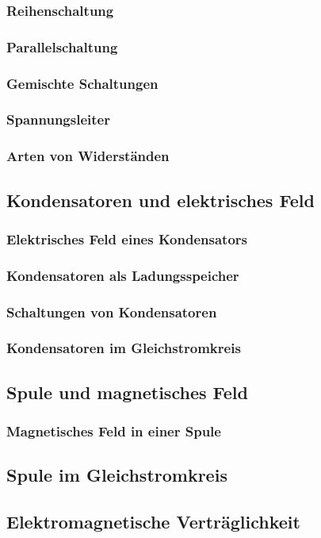 \subsubsection{Reihenschaltung}
\subsubsection{Parallelschaltung}
\subsubsection{Gemischte Schaltungen}
\subsubsection{Spannungsleiter}
\subsubsection{Arten von Widerständen}

\subsection{Kondensatoren und elektrisches Feld}
\subsubsection{Elektrisches Feld eines Kondensators}
\subsubsection{Kondensatoren als Ladungsspeicher}
\subsubsection{Schaltungen von Kondensatoren}
\subsubsection{Kondensatoren im Gleichstromkreis}

\subsection{Spule und magnetisches Feld}
\subsubsection{Magnetisches Feld in einer Spule}
\subsection{Spule im Gleichstromkreis}

\subsection{Elektromagnetische Verträglichkeit}

